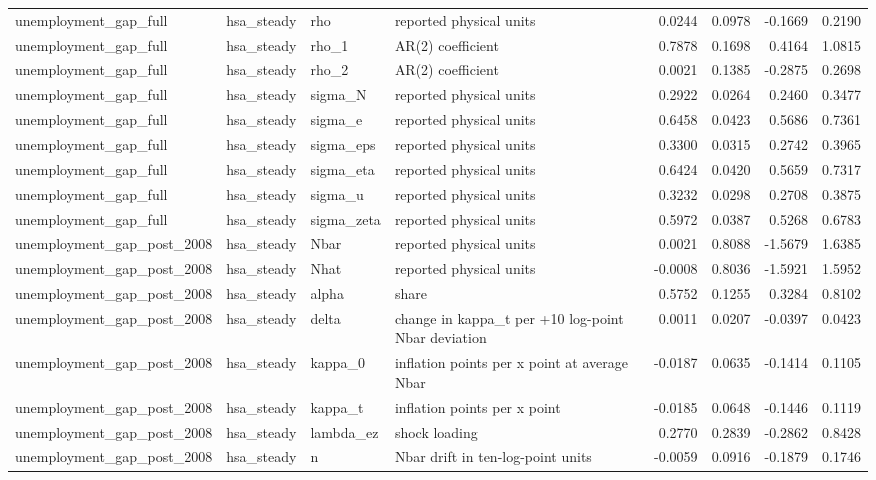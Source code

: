 \begin{tabular}{llllrrrr}
unemployment\_gap\_full & hsa\_steady & rho & reported physical units & 0.0244 & 0.0978 & -0.1669 & 0.2190 \\
unemployment\_gap\_full & hsa\_steady & rho\_1 & AR(2) coefficient & 0.7878 & 0.1698 & 0.4164 & 1.0815 \\
unemployment\_gap\_full & hsa\_steady & rho\_2 & AR(2) coefficient & 0.0021 & 0.1385 & -0.2875 & 0.2698 \\
unemployment\_gap\_full & hsa\_steady & sigma\_N & reported physical units & 0.2922 & 0.0264 & 0.2460 & 0.3477 \\
unemployment\_gap\_full & hsa\_steady & sigma\_e & reported physical units & 0.6458 & 0.0423 & 0.5686 & 0.7361 \\
unemployment\_gap\_full & hsa\_steady & sigma\_eps & reported physical units & 0.3300 & 0.0315 & 0.2742 & 0.3965 \\
unemployment\_gap\_full & hsa\_steady & sigma\_eta & reported physical units & 0.6424 & 0.0420 & 0.5659 & 0.7317 \\
unemployment\_gap\_full & hsa\_steady & sigma\_u & reported physical units & 0.3232 & 0.0298 & 0.2708 & 0.3875 \\
unemployment\_gap\_full & hsa\_steady & sigma\_zeta & reported physical units & 0.5972 & 0.0387 & 0.5268 & 0.6783 \\
unemployment\_gap\_post\_2008 & hsa\_steady & Nbar & reported physical units & 0.0021 & 0.8088 & -1.5679 & 1.6385 \\
unemployment\_gap\_post\_2008 & hsa\_steady & Nhat & reported physical units & -0.0008 & 0.8036 & -1.5921 & 1.5952 \\
unemployment\_gap\_post\_2008 & hsa\_steady & alpha & share & 0.5752 & 0.1255 & 0.3284 & 0.8102 \\
unemployment\_gap\_post\_2008 & hsa\_steady & delta & change in kappa\_t per +10 log-point Nbar deviation & 0.0011 & 0.0207 & -0.0397 & 0.0423 \\
unemployment\_gap\_post\_2008 & hsa\_steady & kappa\_0 & inflation points per x point at average Nbar & -0.0187 & 0.0635 & -0.1414 & 0.1105 \\
unemployment\_gap\_post\_2008 & hsa\_steady & kappa\_t & inflation points per x point & -0.0185 & 0.0648 & -0.1446 & 0.1119 \\
unemployment\_gap\_post\_2008 & hsa\_steady & lambda\_ez & shock loading & 0.2770 & 0.2839 & -0.2862 & 0.8428 \\
unemployment\_gap\_post\_2008 & hsa\_steady & n & Nbar drift in ten-log-point units & -0.0059 & 0.0916 & -0.1879 & 0.1746 \\

\end{tabular}
